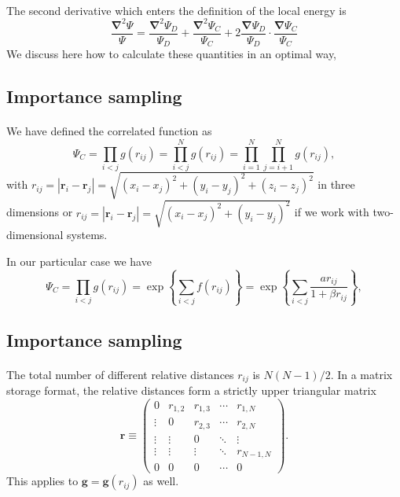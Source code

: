 \documentclass[%
twoside,                 %
final,                   %
10pt]{article}
\begin{document}
\paragraph{}
The second derivative which enters the definition of the local energy is 
\[
\frac{\mathbf{\nabla}^2 \Psi}{\Psi}=\frac{\mathbf{\nabla}^2 \Psi_{D}}{\Psi_{D}} + \frac{\mathbf{\nabla}^2  \Psi_C}{ \Psi_C} + 2 \frac{\mathbf{\nabla}  \Psi_{D}}{\Psi_{D}}\cdot\frac{\mathbf{\nabla}   \Psi_C}{ \Psi_C}
\]
We discuss here how to calculate these quantities in an optimal way,


\subsection*{Importance sampling}

\paragraph{}
We have defined the correlated function as
\[
\Psi_C=\prod_{i< j}g(r_{ij})=\prod_{i< j}^Ng(r_{ij})= \prod_{i=1}^N\prod_{j=i+1}^Ng(r_{ij}),
\]
with 
$r_{ij}=|\mathbf{r}_i-\mathbf{r}_j|=\sqrt{(x_i-x_j)^2+(y_i-y_j)^2+(z_i-z_j)^2}$ in three dimensions or
$r_{ij}=|\mathbf{r}_i-\mathbf{r}_j|=\sqrt{(x_i-x_j)^2+(y_i-y_j)^2}$ if we work with two-dimensional systems.

In our particular case we have
\[
\Psi_C=\prod_{i< j}g(r_{ij})=\exp{\left\{\sum_{i<j}f(r_{ij})\right\}}=
\exp{\left\{\sum_{i<j}\frac{ar_{ij}}{1+\beta r_{ij}}\right\}},
\]




\subsection*{Importance sampling}

\paragraph{}
The total number of different relative distances $r_{ij}$ is $N(N-1)/2$. In a matrix storage format, the relative distances  form a strictly upper triangular matrix
\[
 \mathbf{r} \equiv \begin{pmatrix}
  0 & r_{1,2} & r_{1,3} & \cdots & r_{1,N} \\
  \vdots & 0       & r_{2,3} & \cdots & r_{2,N} \\
  \vdots & \vdots  & 0  & \ddots & \vdots  \\
  \vdots & \vdots  & \vdots  & \ddots  & r_{N-1,N} \\
  0 & 0  & 0  & \cdots  & 0
 \end{pmatrix}.
\]
This applies to  $\mathbf{g} = \mathbf{g}(r_{ij})$ as well. 
\end{document}
